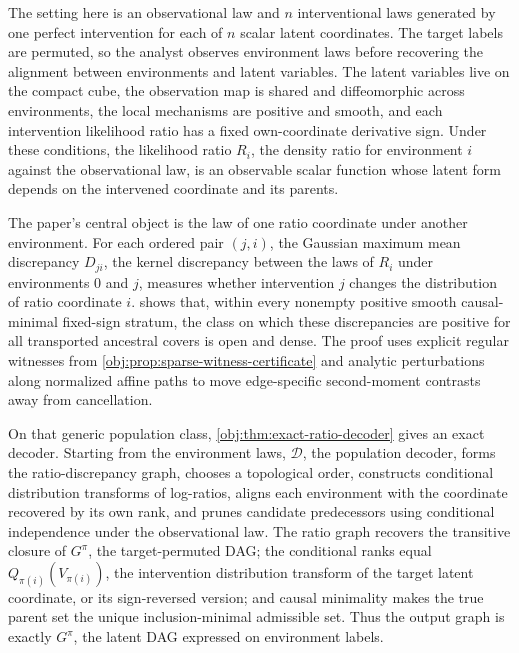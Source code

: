 The setting here is an observational law and \(n\) interventional laws generated by one perfect intervention for each of \(n\) scalar latent coordinates. The target labels are permuted, so the analyst observes environment laws before recovering the alignment between environments and latent variables. The latent variables live on the compact cube, the observation map is shared and diffeomorphic across environments, the local mechanisms are positive and smooth, and each intervention likelihood ratio has a fixed own-coordinate derivative sign. Under these conditions, the likelihood ratio \(R_i\), the density ratio for environment \(i\) against the observational law, is an observable scalar function whose latent form depends on the intervened coordinate and its parents.

The paper's central object is the law of one ratio coordinate under another environment. For each ordered pair \((j,i)\), the Gaussian maximum mean discrepancy \(D_{ji}\), the kernel discrepancy between the laws of \(R_i\) under environments \(0\) and \(j\), measures whether intervention \(j\) changes the distribution of ratio coordinate \(i\).  shows that, within every nonempty positive smooth causal-minimal fixed-sign stratum, the class on which these discrepancies are positive for all transported ancestral covers is open and dense. The proof uses explicit regular witnesses from \cref{obj:prop:sparse-witness-certificate} and analytic perturbations along normalized affine paths to move edge-specific second-moment contrasts away from cancellation.

On that generic population class, \cref{obj:thm:exact-ratio-decoder} gives an exact decoder. Starting from the environment laws, \(\mathscr D\), the population decoder, forms the ratio-discrepancy graph, chooses a topological order, constructs conditional distribution transforms of log-ratios, aligns each environment with the coordinate recovered by its own rank, and prunes candidate predecessors using conditional independence under the observational law. The ratio graph recovers the transitive closure of \(G^\pi\), the target-permuted DAG; the conditional ranks equal \(Q_{\pi(i)}(V_{\pi(i)})\), the intervention distribution transform of the target latent coordinate, or its sign-reversed version; and causal minimality makes the true parent set the unique inclusion-minimal admissible set. Thus the output graph is exactly \(G^\pi\), the latent DAG expressed on environment labels.


